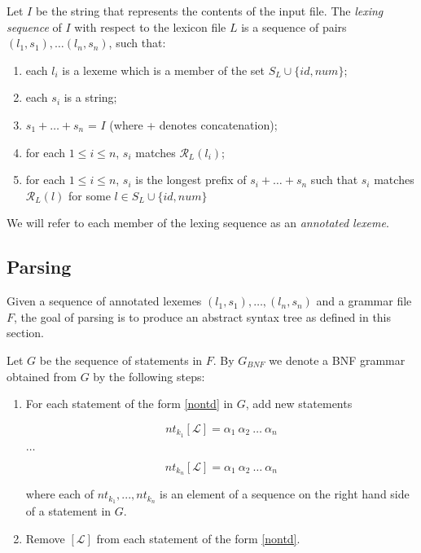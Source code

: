 \documentclass[a4paper,10pt]{article}
\begin{document}
Let $I$ be the string that represents the contents of the input file. 
The \textit{lexing sequence} of $I$ with respect to the lexicon file $L$ is a sequence of pairs $(l_1,s_1),\ldots (l_n,s_n)$, such that:

\begin{enumerate}
\item each $l_i$ is a lexeme which is a member of the set $S_L \cup \{id,num\}$;
\item each $s_i$ is a string;
\item $s_1+\ldots+s_n$ = $I$ (where + denotes concatenation);
\item for each $1 \le i  \le n$, $s_i$ matches $\mathcal{R}_L(l_i)$;
\item for each $1 \le i \le n$, $s_i$ is the longest prefix of $s_i+\ldots+s_n$ such that $s_i$ matches  $\mathcal{R}_L(l)$ for some  $l \in  S_L \cup \{id,num\}$ 
\end{enumerate}


We will refer to each member of the lexing sequence as an \textit{annotated lexeme}.






\subsection{Parsing}\label{pars}
Given a sequence of annotated lexemes  $(l_1,s_1),\ldots, (l_n,s_n)$ and a grammar file $F$, the goal of parsing is to produce an abstract syntax tree  as defined in this section. 

Let $G$ be the sequence of statements in $F$. By $G_{BNF}$ we denote a BNF grammar obtained from $G$ by the following steps:

\begin{enumerate}
\item For each statement of the form \ref{nontd} in $G$, add new statements

$$nt_{k_1}[\mathcal{L}] = \alpha_1~\alpha_2~\ldots~\alpha_n$$ 

$\ldots$

$$nt_{k_n}[\mathcal{L}] = \alpha_1~\alpha_2~\ldots~\alpha_n$$

where each of $nt_{k_1},...,nt_{k_n}$ is an element of a sequence on the right hand side of a statement in $G$.  
\item Remove $[\mathcal{L}]$ from each statement of the form \ref{nontd}. 
\end{enumerate}
\end{document}
